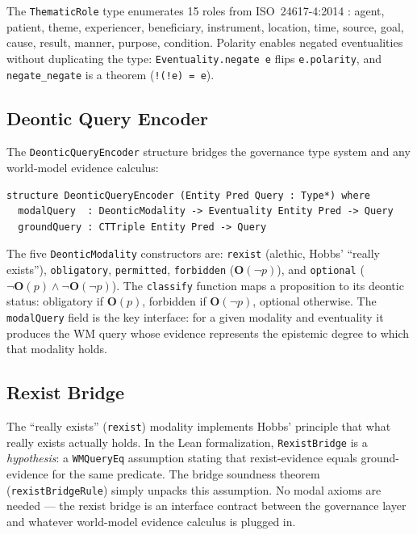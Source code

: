 \documentclass[]{article}
\newcommand{\code}[1]{\texttt{#1}}
\newcommand{\OB}{\ensuremath{\mathbf{O}}}
\begin{document}
\noindent
The \code{ThematicRole} type enumerates 15 roles from ISO~24617-4:2014
\cite{ISO246174}: agent, patient, theme, experiencer, beneficiary, instrument,
location, time, source, goal, cause, result, manner, purpose, condition.
Polarity enables negated eventualities without duplicating the type:
\code{Eventuality.negate e} flips \code{e.polarity}, and
\code{negate\_negate} is a theorem (\code{!(!e) = e}).

\subsection{Deontic Query Encoder}

The \code{DeonticQueryEncoder} structure bridges the governance type system
and any world-model evidence calculus:

\begin{lstlisting}
structure DeonticQueryEncoder (Entity Pred Query : Type*) where
  modalQuery  : DeonticModality -> Eventuality Entity Pred -> Query
  groundQuery : CTTriple Entity Pred -> Query
\end{lstlisting}

\noindent
The five \code{DeonticModality} constructors are: \code{rexist} (alethic,
Hobbs' ``really exists''), \code{obligatory}, \code{permitted},
\code{forbidden} ($\OB(\neg p)$), and \code{optional} ($\neg\OB(p) \wedge \neg\OB(\neg p)$).
The \code{classify} function maps a proposition to its deontic status:
obligatory if $\OB(p)$, forbidden if $\OB(\neg p)$, optional otherwise.
The \code{modalQuery} field is the key interface: for a given modality and
eventuality it produces the WM query whose evidence represents the epistemic
degree to which that modality holds.

\subsection{Rexist Bridge}

The ``really exists'' (\code{rexist}) modality implements Hobbs' principle
that what really exists actually holds.  In the Lean formalization,
\code{RexistBridge} is a \emph{hypothesis}: a \code{WMQueryEq} assumption
stating that rexist-evidence equals ground-evidence for the same predicate.
The bridge soundness theorem (\code{rexistBridgeRule}) simply unpacks
this assumption.  No modal axioms are needed --- the rexist bridge is an
interface contract between the governance layer and whatever world-model
evidence calculus is plugged in.
\end{document}
